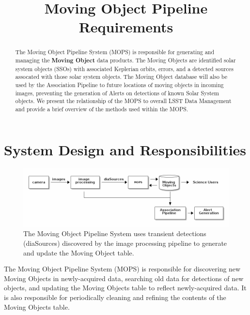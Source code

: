\documentclass[12pt,preprint]{aastex}
\begin{document}
\title{Moving Object Pipeline Requirements}

\author{}

\begin{abstract}

The Moving Object Pipeline System (MOPS) is responsible for generating
and managing the \textbf{Moving Object} data products.  The Moving
Objects are identified solar system objects (SSOs) with associated
Keplerian orbits, errors, and a detected sources assocated with those
solar system objects.  The Moving Object database will also be used by
the Association Pipeline to future locations of moving objects in
incoming images, preventing the generation of Alerts on detections of
known Solar System objects.  We present the relationship of the MOPS
to overall LSST Data Management and provide a brief overview of the
methods used within the MOPS.

\end{abstract}

\tableofcontents


\section{System Design and Responsibilities}

 

\begin{figure}[!ht]
\begin{center}
  \includegraphics[width=13cm]{illustrations/mopsWithinLsst.png}
\end{center}
\caption{The Moving Object Pipeline System uses transient detections
  (diaSources) discovered by the image processing pipeline to generate
  and update the Moving Object table. }
\end{figure}


The Moving Object Pipeline System (MOPS) is responsible for
discovering new Moving Objects in newly-acquired data, searching old
data for detections of new objects, and updating the Moving Objects
table to reflect newly-acquired data. It is also responsible for
periodically cleaning and refining the contents of the Moving Objects
table.
\end{document}
